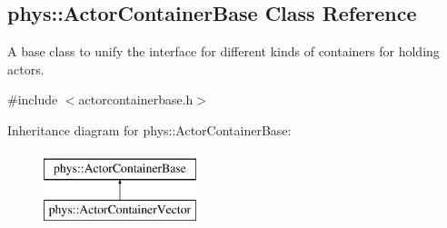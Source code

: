 \hypertarget{classphys_1_1ActorContainerBase}{
\subsection{phys::ActorContainerBase Class Reference}
\label{classphys_1_1ActorContainerBase}
}


A base class to unify the interface for different kinds of containers for holding actors.  




{\ttfamily \#include $<$actorcontainerbase.h$>$}

Inheritance diagram for phys::ActorContainerBase:\begin{figure}[H]
\begin{center}
\leavevmode
\includegraphics[height=2.000000cm]{classphys_1_1ActorContainerBase}
\end{center}
\end{figure}
